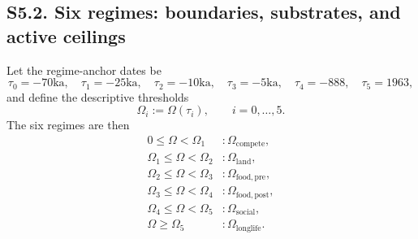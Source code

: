 \documentclass[11pt]{article}
\begin{document}
\subsection*{S5.2. Six regimes: boundaries, substrates, and active ceilings}\label{subsec:S5_regimes}
Let the regime-anchor dates be
\begin{equation}\tau_0=-70\mathrm{ka},\quad\tau_1=-25\mathrm{ka},\quad\tau_2=-10\mathrm{ka},\quad\tau_3=-5\mathrm{ka},\quad\tau_4=-888,\quad\tau_5=1963,\tag{S5.3}\label{eq:S5_tau}\end{equation}
and define the descriptive thresholds
\begin{equation}\Omega_i:=\Omega(\tau_i),\qquad i=0,\dots,5.\tag{S5.4}\label{eq:S5_Omegai}\end{equation}
The six regimes are then
\begin{equation}\begin{aligned}0\le \Omega<\Omega_1 &: \Omega_{\mathrm{compete}},\\\Omega_1\le \Omega<\Omega_2 &: \Omega_{\mathrm{land}},\\\Omega_2\le \Omega<\Omega_3 &: \Omega_{\mathrm{food,pre}},\\\Omega_3\le \Omega<\Omega_4 &: \Omega_{\mathrm{food,post}},\\\Omega_4\le \Omega<\Omega_5 &: \Omega_{\mathrm{social}},\\\Omega\ge \Omega_5 &: \Omega_{\mathrm{longlife}}.\end{aligned}\tag{S5.5}\label{eq:S5_regime_rule}\end{equation}
\end{document}
